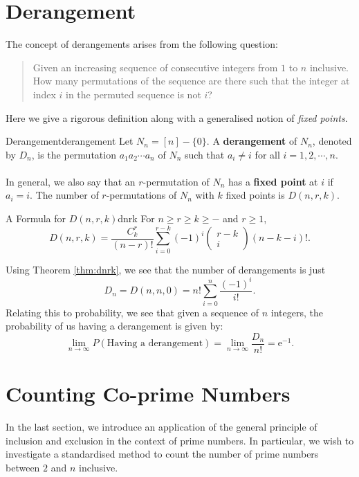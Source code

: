\documentclass[math]{amznotes}
\theoremstyle{remark}
\begin{document}
\section{Derangement}
The concept of derangements arises from the following question:
\begin{quote}
    Given an increasing sequence of consecutive integers from $1$ to $n$ inclusive. How many permutations of the sequence are there such that the integer at index $i$ in the permuted sequence is not $i$?
\end{quote}
Here we give a rigorous definition along with a generalised notion of \textit{fixed points}.
\begin{dfnbox}{Derangement}{derangement}
    Let $N_n = [n] - \{0\}$. A {\color{red} \textbf{derangement}} of $N_n$, denoted by $D_n$, is the permutation $a_1a_2\cdots a_n$ of $N_n$ such that $a_i \neq i$ for all $i = 1, 2, \cdots, n$.
    \\\\
    In general, we also say that an $r$-permutation of $N_n$ has a {\color{red} \textbf{fixed point}} at $i$ if $a_i = i$. The number of $r$-permutations of $N_n$ with $k$ fixed points is $D(n, r, k)$.
\end{dfnbox}
\begin{thmbox}{A Formula for $D(n, r, k)$}{dnrk}
    For $n \geq r \geq k \geq -$ and $r \geq 1$,
    \begin{equation*}
        D(n, r, k) = \frac{C^r_k}{(n - r)!}\sum_{i = 0}^{r - k}(-1)^i \begin{pmatrix}
            r - k \\
            i
        \end{pmatrix}(n - k - i)!.
    \end{equation*}
\end{thmbox}
Using Theorem \ref{thm:dnrk}, we see that the number of derangements is just
\begin{equation*}
    D_n = D(n, n, 0) = n!\sum_{i = 0}^{n}\frac{(-1)^i}{i!}.
\end{equation*}
Relating this to probability, we see that given a sequence of $n$ integers, the probability of us having a derangement is given by:
\begin{equation*}
    \lim_{n \to \infty}P(\textrm{Having a derangement}) = \lim_{n \to \infty}\frac{D_n}{n!} = \mathrm{e}^{-1}.
\end{equation*}

\section{Counting Co-prime Numbers}
In the last section, we introduce an application of the general principle of inclusion and exclusion in the context of prime numbers. In particular, we wish to investigate a standardised method to count the number of prime numbers between $2$ and $n$ inclusive.
\end{document}
